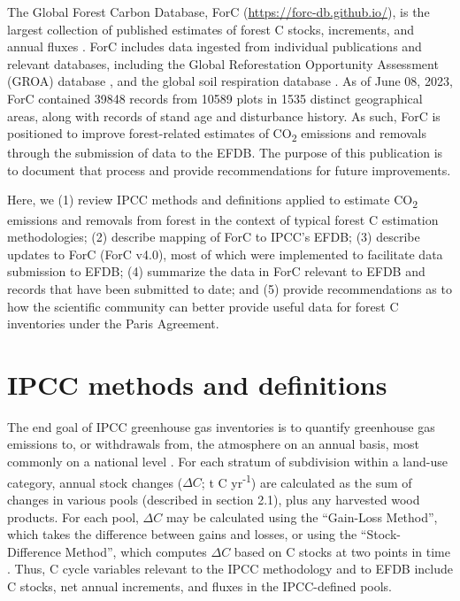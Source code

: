 \documentclass[, manuscript]{copernicus}
\begin{document}
The Global Forest Carbon Database, ForC
(\url{https://forc-db.github.io/}), is the largest collection of
published estimates of forest C stocks, increments, and annual fluxes
\citep{anderson-teixeira_forc_2018, anderson-teixeira_carbon_2021}. ForC
includes data ingested from individual publications and relevant
databases, including the Global Reforestation Opportunity Assessment
(GROA) database \citep[database doi:
10.5281/zenodo.3983644]{cook-patton_mapping_2020}, and the global soil
respiration database
\citep[SRDB-V5,][]{bond-lamberty_global_2010, jian_restructured_2021}.
As of June 08, 2023, ForC contained 39848 records from 10589 plots in
1535 distinct geographical areas, along with records of stand age and
disturbance history. As such, ForC is positioned to improve
forest-related estimates of CO\textsubscript{2} emissions and removals
through the submission of data to the EFDB. The purpose of this
publication is to document that process and provide recommendations for
future improvements.

Here, we (1) review IPCC methods and definitions applied to estimate
CO\textsubscript{2} emissions and removals from forest in the context of
typical forest C estimation methodologies; (2) describe mapping of ForC
to IPCC's EFDB; (3) describe updates to ForC (ForC v4.0), most of which
were implemented to facilitate data submission to EFDB; (4) summarize
the data in ForC relevant to EFDB and records that have been submitted
to date; and (5) provide recommendations as to how the scientific
community can better provide useful data for forest C inventories under
the Paris Agreement.

\section{IPCC methods and definitions}

The end goal of IPCC greenhouse gas inventories is to quantify
greenhouse gas emissions to, or withdrawals from, the atmosphere on an
annual basis, most commonly on a national level
\citep{ipcc_2006_2006, ipcc_2019_2019}. For each stratum of subdivision
within a land-use category, annual stock changes (\(\Delta C\); t C
yr\textsuperscript{-1}) are calculated as the sum of changes in various
pools (described in section 2.1), plus any harvested wood products. For
each pool, \(\Delta C\) may be calculated using the ``Gain-Loss
Method'', which takes the difference between gains and losses, or using
the ``Stock-Difference Method'', which computes \(\Delta C\) based on C
stocks at two points in time \citep{ipcc_2006_2006}. Thus, C cycle
variables relevant to the IPCC methodology and to EFDB include C stocks,
net annual increments, and fluxes in the IPCC-defined pools.
\end{document}
